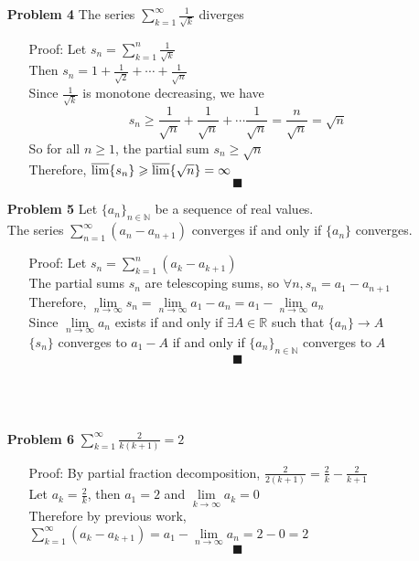 \documentclass[a4paper,12pt]{report}
\begin{document}
\begin{enumerate}
\item[\bf{Problem 4}] The series $\sum\limits_{k=1}^{\infty} \frac{1}{\sqrt{k}}$ diverges
	\begin{enumerate}
	\item[Proof:] 
	Let $s_n = \sum\limits_{k=1}^{n} \frac{1}{\sqrt{k}}$ \\
	Then $s_n = 1 + \frac{1}{\sqrt{2}} + \cdots + \frac{1}{\sqrt{n}}$ \\
	Since $\frac{1}{\sqrt{k}}$ is monotone decreasing, we have
	\[
		s_n \geqslant 
		\frac{1}{\sqrt{n}} + \frac{1}{\sqrt{n}} + \cdots \frac{1}{\sqrt{n}}
		= \frac{n}{\sqrt{n}} = \sqrt{n}
	\]
	So for all $n \geqslant 1$, the partial sum $s_n \geqslant \sqrt{n}$ \\
	Therefore, $\varlimsup\{s_n\} \geqslant \varlimsup\{\sqrt{n}\} = \infty$ 
	\[\blacksquare\]
	\end{enumerate}
\pagebreak
\item[\bf{Problem 5}] Let $\{a_n\}_{n\in\mathbb{N}}$ be a sequence of real values. \\
	The series $\sum\limits_{n=1}^{\infty}(a_n - a_{n+1})$ converges if and only if $\{a_n\}$ converges.
	\begin{enumerate}
	\item[Proof:] 
	Let $s_n = \sum\limits_{k=1}^{n}(a_k - a_{k+1})$ \\
	The partial sums $s_n$ are telescoping sums, so $\forall n, s_n = a_1 - a_{n+1}$ \\
	Therefore, $\lim\limits_{n \to \infty} s_n = \lim\limits_{n \to \infty} a_1 - a_n = a_1 - \lim\limits_{n \to \infty} a_n$ \\
	Since $\lim\limits_{n \to \infty} a_n$ exists if and only if $\exists A \in \mathbb{R}$ such that $\{a_n\} \to A$ \\
	$\{s_n\}$ converges to $a_1 - A$ if and only if $\{a_n\}_{n\in\mathbb{N}}$ converges to $A$
	\[\blacksquare\]\\\\\\
	\end{enumerate}

\item[\bf{Problem 6}] $\sum\limits_{k=1}^{\infty}\frac{2}{k(k+1)} = 2$
	\begin{enumerate}
	\item[Proof:]
	By partial fraction decomposition, $\frac{2}{2(k+1)} = \frac{2}{k} - \frac{2}{k+1}$ \\
	Let $a_k = \frac{2}{k}$, then $a_1 = 2$ and $\lim\limits_{k \to \infty} a_k = 0$ \\
	Therefore by previous work, \\
	$\sum\limits_{k=1}^{\infty}(a_k - a_{k+1}) = a_1 - \lim\limits_{n \to \infty}a_n = 2 - 0 = 2$
	\[\blacksquare\]\\\\\\
	\end{enumerate}

\end{enumerate}
\end{document}
